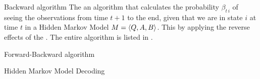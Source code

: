 \begin{df}{Backward algorithm}
The \sb{} an algorithm that calculates the probability $\beta_{t\,i}$ of seeing the observations from time $t+1$ to the end, given that we are in state $i$ at time $t$ in a Hidden Markov Model $M=\left\langle Q,A,B\right\rangle$. This by applying the reverse effects of the . The entire algorithm is listed in .
\end{df}
\begin{df}{Forward-Backward algorithm}

\end{df}
\begin{df}{Hidden Markov Model Decoding}

\end{df}